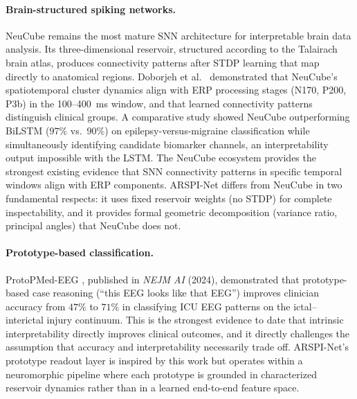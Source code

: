 \paragraph{Brain-structured spiking networks.} NeuCube \cite{kasabov_neucube_2014} remains the most mature SNN architecture for interpretable brain data analysis. Its three-dimensional reservoir, structured according to the Talairach brain atlas, produces connectivity patterns after STDP learning that map directly to anatomical regions. Doborjeh et al.\ \cite{doborjeh_explainable_2021} demonstrated that NeuCube's spatiotemporal cluster dynamics align with ERP processing stages (N170, P200, P3b) in the 100--400~ms window, and that learned connectivity patterns distinguish clinical groups. A comparative study \cite{doborjeh_epilepsy_2024} showed NeuCube outperforming BiLSTM ($97\%$ vs.\ $90\%$) on epilepsy-versus-migraine classification while simultaneously identifying candidate biomarker channels, an interpretability output impossible with the LSTM. The NeuCube ecosystem provides the strongest existing evidence that SNN connectivity patterns in specific temporal windows align with ERP components. ARSPI-Net differs from NeuCube in two fundamental respects: it uses fixed reservoir weights (no STDP) for complete inspectability, and it provides formal geometric decomposition (variance ratio, principal angles) that NeuCube does not.

\paragraph{Prototype-based classification.} ProtoPMed-EEG \cite{barnett_protopmed_2024}, published in \emph{NEJM AI} (2024), demonstrated that prototype-based case reasoning (``this EEG looks like that EEG'') improves clinician accuracy from $47\%$ to $71\%$ in classifying ICU EEG patterns on the ictal--interictal injury continuum. This is the strongest evidence to date that intrinsic interpretability directly improves clinical outcomes, and it directly challenges the assumption that accuracy and interpretability necessarily trade off. ARSPI-Net's prototype readout layer is inspired by this work but operates within a neuromorphic pipeline where each prototype is grounded in characterized reservoir dynamics rather than in a learned end-to-end feature space.

